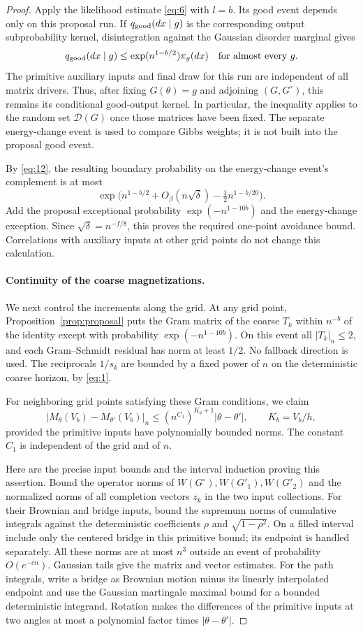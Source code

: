 \begin{proof}
Apply the likelihood estimate \eqref{eq:6} with $l=b$. Its good
event depends only on this proposal run. If
$q_{\rm good}(dx\mid g)$ is the corresponding output
subprobability kernel, disintegration against the Gaussian disorder
marginal gives
\[
 q_{\rm good}(dx\mid g)
 \le\exp(n^{1-b/2})\pi_g(dx)
 \quad\text{for almost every }g.
\]
The primitive auxiliary inputs and final draw for this run are
independent of all matrix drivers. Thus, after fixing
$G(\theta)=g$ and adjoining $(G,G^\circ)$, this remains its
conditional good-output kernel. In particular, the inequality applies
to the random set $\mathcal D(G)$ once those matrices have been
fixed. The separate energy-change event is used to compare Gibbs
weights; it is not built into the proposal good event.

By \eqref{eq:12}, the resulting boundary probability on the
energy-change event's complement is at most
\[
 \exp\bigl(n^{1-b/2}+O_\beta(n\sqrt\delta)
                   -\tfrac12n^{1-b/20}\bigr).
\]
Add the proposal exceptional probability
$\exp(-n^{1-10b})$ and the energy-change exception. Since
$\sqrt\delta=n^{-f/8}$, this proves the required one-point
avoidance bound. Correlations with auxiliary inputs at other grid
points do not change this calculation.

\paragraph{Continuity of the coarse magnetizations.}
We next control the increments along the grid. At any grid point,
Proposition~\ref{prop:proposal} puts the Gram matrix of the coarse
$T_k$ within $n^{-b}$ of the identity except with probability
$\exp(-n^{1-10b})$. On this event all $|T_k|_n\le2$, and each
Gram--Schmidt residual has norm at least $1/2$. No fallback direction
is used. The reciprocals $1/s_k$ are bounded by a fixed power of $n$
on the deterministic coarse horizon, by \eqref{eq:1}.

For neighboring grid points satisfying these Gram conditions, we claim
\[
 |M_\theta(V_b)-M_{\theta'}(V_b)|_n
 \le(n^{C_1})^{K_b+1}|\theta-\theta'|,
 \qquad K_b=V_b/h,
 \tag{13}\label{eq:13}
\]
provided the primitive inputs have polynomially bounded norms.
The constant $C_1$ is independent of the grid and of $n$.

Here are the precise input bounds and the interval induction proving
this assertion. Bound the operator norms of
$W(G^\circ),W(G'_1),W(G'_2)$ and the normalized norms of all
completion vectors $z_k$ in the two input collections. For their
Brownian and bridge inputs, bound the supremum norms of cumulative
integrals against the deterministic coefficients $\rho$ and
$\sqrt{1-\rho^2}$. On a filled interval include only the centered
bridge in this primitive bound; its endpoint is handled separately.
All these norms are at most $n^3$ outside an event of probability
$O(e^{-cn})$. Gaussian tails give the matrix and vector estimates.
For the path integrals, write a bridge as Brownian motion minus
its linearly interpolated endpoint and use the Gaussian martingale
maximal bound for a bounded deterministic integrand. Rotation makes
the differences of the primitive inputs at two angles at most a
polynomial factor times $|\theta-\theta'|$.


\end{proof}

